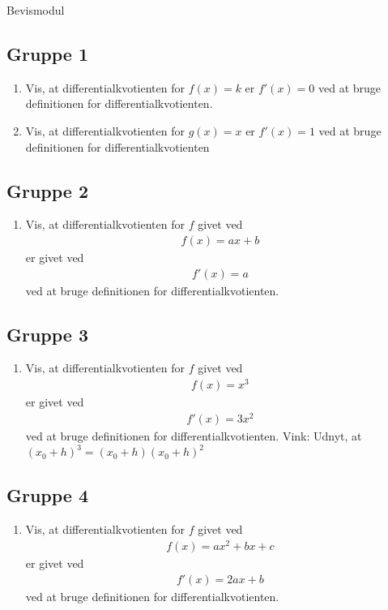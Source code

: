 \begin{center}
	\Huge
	Bevismodul
\end{center}

\subsection*{Gruppe 1}

\begin{enumerate}[label=\roman*)]
	\item Vis, at differentialkvotienten for $f(x) = k$ er $f'(x) = 0$ ved at bruge definitionen for
	differentialkvotienten.
	\item Vis, at differentialkvotienten for $g(x) = x$ er $f'(x) = 1$ ved at bruge definitionen for 
	differentialkvotienten
\end{enumerate}

\subsection*{Gruppe 2}
\begin{enumerate}[label=\roman*)]
	\item Vis, at differentialkvotienten for $f$ givet ved
	\begin{align*}
		f(x) = ax + b
	\end{align*}
	er givet ved
	\begin{align*}
		f'(x) = a
	\end{align*}
	ved at bruge definitionen for differentialkvotienten. 
\end{enumerate}

\subsection*{Gruppe 3}
\begin{enumerate}[label=\roman*)]
	\item Vis, at differentialkvotienten for $f$ givet ved
	\begin{align*}
		f(x) = x^3
	\end{align*}
	er givet ved
	\begin{align*}
		f'(x) = 3x^2
	\end{align*}
	ved at bruge definitionen for differentialkvotienten. Vink: Udnyt, at $(x_0+h)^3 = (x_0+h)(x_0+h)^2$
\end{enumerate}

\subsection*{Gruppe 4}
\begin{enumerate}[label=\roman*)]
	\item Vis, at differentialkvotienten for $f$ givet ved
	\begin{align*}
		f(x) = ax^2+bx+c
	\end{align*}
	er givet ved
	\begin{align*}
		f'(x) = 2ax+b
	\end{align*}
	ved at bruge definitionen for differentialkvotienten.
\end{enumerate}

